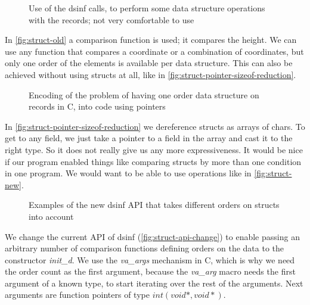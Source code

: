 \documentclass[a4paper,11pt]{article}
\begin{document}
            \begin{figure}[h!]
				

				\caption{Use of the dsinf calls, to perform some data structure operations with the
				records; not very comfortable to use}

				\label{fig:struct-old}
			\end{figure}

			In \autoref{fig:struct-old} a comparison function is used; it compares the height. We can use
			any function that compares a coordinate or a combination of coordinates, but only one order of
			the elements is available per data structure. This can also be achieved without using structs at
			all, like in \autoref{fig:struct-pointer-sizeof-reduction}.

            \begin{figure}[h!]
				

				\caption{Encoding of the problem of having one order data structure on records in C,
				into code using pointers}

				\label{fig:struct-pointer-sizeof-reduction}
			\end{figure}

			In \autoref{fig:struct-pointer-sizeof-reduction} we dereference structs as arrays of
			chars. To get to any field, we just take a pointer to a field in the array and cast it to the
			right type. So it does not really give us any more expressiveness. It would be nice if our
			program enabled things like comparing structs by more than one condition in one program. We
			would want to be able to use operations like in \autoref{fig:struct-new}.

            \begin{figure}[h!]
				

				\caption{Examples of the new dsinf API that takes different orders on structs into
				account}

				\label{fig:struct-new}
			\end{figure}

            We change the current API of dsinf (\autoref{fig:struct-api-change}) to enable passing an arbitrary number
            of comparison functions defining orders on the data to the constructor \emph{init\_d}. We use the \emph{va\_args}
            mechanism in C, which is why we need the order count as the first argument, because the \emph{va\_arg} macro needs
            the first argument of a known type, to start iterating over the rest of the arguments. Next arguments are
            function pointers of type $int(void *, void *)$.
\end{document}
